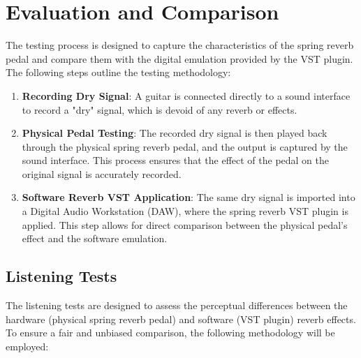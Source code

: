 \documentclass[12pt]{article}
\begin{document}

\newpage
\section{Evaluation and Comparison}
The testing process is designed to capture the characteristics of the spring reverb pedal and compare them with the digital emulation provided by the VST plugin. The following steps outline the testing methodology:
\begin{enumerate}
    \item \textbf{Recording Dry Signal}: A guitar is connected directly to a sound interface to record a "dry" signal, which is devoid of any reverb or effects.
    \item \textbf{Physical Pedal Testing}: The recorded dry signal is then played back through the physical spring reverb pedal, and the output is captured by the sound interface. This process ensures that the effect of the pedal on the original signal is accurately recorded.
    \item \textbf{Software Reverb VST Application}: The same dry signal is imported into a Digital Audio Workstation (DAW), where the spring reverb VST plugin is applied. This step allows for direct comparison between the physical pedal's effect and the software emulation.
\end{enumerate}

\subsection{Listening Tests}
The listening tests are designed to assess the perceptual differences between the hardware (physical spring reverb pedal) and software (VST plugin) reverb effects. To ensure a fair and unbiased comparison, the following methodology will be employed:
\end{document}
